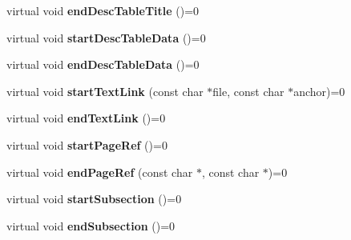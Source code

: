 \begin{DoxyCompactItemize}
\item 
\hypertarget{class_base_output_doc_interface_aaed05f66abc76e55eb0f29b7aa53b1a4}{virtual void {\bfseries end\-Desc\-Table\-Title} ()=0}\label{class_base_output_doc_interface_aaed05f66abc76e55eb0f29b7aa53b1a4}

\item 
\hypertarget{class_base_output_doc_interface_a4483cdc52a9f793056a2453461694140}{virtual void {\bfseries start\-Desc\-Table\-Data} ()=0}\label{class_base_output_doc_interface_a4483cdc52a9f793056a2453461694140}

\item 
\hypertarget{class_base_output_doc_interface_a8043221f1b448305052cd20ea217d369}{virtual void {\bfseries end\-Desc\-Table\-Data} ()=0}\label{class_base_output_doc_interface_a8043221f1b448305052cd20ea217d369}

\item 
\hypertarget{class_base_output_doc_interface_ae0957fca439bf053074d836651758546}{virtual void {\bfseries start\-Text\-Link} (const char $\ast$file, const char $\ast$anchor)=0}\label{class_base_output_doc_interface_ae0957fca439bf053074d836651758546}

\item 
\hypertarget{class_base_output_doc_interface_a640f630abbcef3317d1cee5e2b826787}{virtual void {\bfseries end\-Text\-Link} ()=0}\label{class_base_output_doc_interface_a640f630abbcef3317d1cee5e2b826787}

\item 
\hypertarget{class_base_output_doc_interface_afd43d0892b17aca482d193e2b2e87621}{virtual void {\bfseries start\-Page\-Ref} ()=0}\label{class_base_output_doc_interface_afd43d0892b17aca482d193e2b2e87621}

\item 
\hypertarget{class_base_output_doc_interface_a69133cf7a4807f45f0d6ace5b0411cc9}{virtual void {\bfseries end\-Page\-Ref} (const char $\ast$, const char $\ast$)=0}\label{class_base_output_doc_interface_a69133cf7a4807f45f0d6ace5b0411cc9}

\item 
\hypertarget{class_base_output_doc_interface_a5f305cc66aed16c1413de29887a11932}{virtual void {\bfseries start\-Subsection} ()=0}\label{class_base_output_doc_interface_a5f305cc66aed16c1413de29887a11932}

\item 
\hypertarget{class_base_output_doc_interface_a09031f1d85363c381f54acf23ea5b1c9}{virtual void {\bfseries end\-Subsection} ()=0}\label{class_base_output_doc_interface_a09031f1d85363c381f54acf23ea5b1c9}


\end{DoxyCompactItemize}
